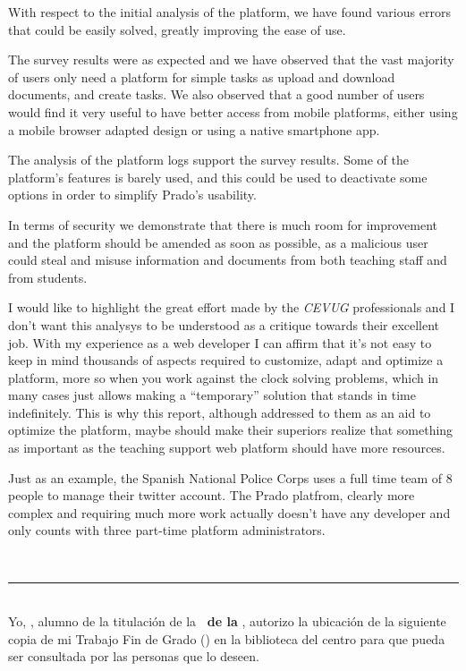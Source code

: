 {{\bigskip
With respect to the initial analysis of the platform, we have found various errors that could be easily solved, greatly improving the ease of use.

\bigskip
The survey results were as expected and we have observed that the vast majority of users only need a platform for simple tasks as upload and download documents, and create tasks. We also observed that a good number of users would find it very useful to have better access from mobile platforms, either using a mobile browser adapted design or using a native smartphone app.

\bigskip
The analysis of the platform logs support the survey results. Some of the platform’s features is barely used, and this could be used to deactivate some options in order to simplify Prado’s usability.

\bigskip
In terms of security we demonstrate that there is much room for improvement and the platform should be amended as soon as possible, as a malicious user could steal and misuse information and documents from both teaching staff and from students.

\bigskip
I would like to highlight the great effort made by the \textit{CEVUG} professionals and I don't want this analysys to be understood as a critique towards their excellent job. With my experience as a web developer I can affirm that it’s not easy to keep in mind thousands of aspects required to customize, adapt and optimize a platform, more so when you work against the clock solving problems, which in many cases just allows making a ``temporary'' solution that stands in time indefinitely. This is why this report, although addressed to them as an aid to optimize the platform, maybe should make their superiors realize that something as important as the teaching support web platform should have more resources.

\bigskip
Just as an example, the Spanish National Police Corps uses a full time team of 8 people to manage their twitter account. The Prado platfrom, clearly more complex and requiring much more work actually doesn't have any developer and only counts with three part-time platform administrators.


\newpage
\thispagestyle{empty}
\
\vspace{3cm}

\noindent\rule[-1ex]{\textwidth}{2pt}\\[4.5ex]

Yo, \textbf{\autor}, alumno de la titulación \textbf{\grado} de la \textbf{\escuela\ de la \universidad}, autorizo la ubicación de la siguiente copia de mi Trabajo Fin de Grado (\textit{\titulo}) en la biblioteca del centro para que pueda ser consultada por las personas que lo deseen.

}}
